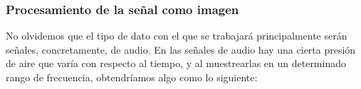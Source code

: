 \documentclass[11pt,a4paper,spanish]{book}
\begin{document}

	\subsubsection{Procesamiento de la señal como imagen}

	
	No olvidemos que el tipo de dato con el que se trabajará principalmente serán señales, concretamente, de audio. En las señales de audio hay una cierta presión de aire que varía con respecto al tiempo, y al muestrearlas en un determinado rango de frecuencia, obtendríamos algo como lo siguiente:
	
\end{document}
